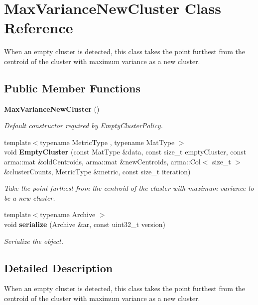 \section{Max\+Variance\+New\+Cluster Class Reference}
\label{classmlpack_1_1kmeans_1_1MaxVarianceNewCluster}


When an empty cluster is detected, this class takes the point furthest from the centroid of the cluster with maximum variance as a new cluster.  


\subsection*{Public Member Functions}
\begin{DoxyCompactItemize}
\item 
\textbf{ Max\+Variance\+New\+Cluster} ()
\begin{DoxyCompactList}\small\item\em Default constructor required by Empty\+Cluster\+Policy. \end{DoxyCompactList}\item 
{\footnotesize template$<$typename Metric\+Type , typename Mat\+Type $>$ }\\void \textbf{ Empty\+Cluster} (const Mat\+Type \&data, const size\+\_\+t empty\+Cluster, const arma\+::mat \&old\+Centroids, arma\+::mat \&new\+Centroids, arma\+::\+Col$<$ size\+\_\+t $>$ \&cluster\+Counts, Metric\+Type \&metric, const size\+\_\+t iteration)
\begin{DoxyCompactList}\small\item\em Take the point furthest from the centroid of the cluster with maximum variance to be a new cluster. \end{DoxyCompactList}\item 
{\footnotesize template$<$typename Archive $>$ }\\void \textbf{ serialize} (Archive \&ar, const uint32\+\_\+t version)
\begin{DoxyCompactList}\small\item\em Serialize the object. \end{DoxyCompactList}\end{DoxyCompactItemize}


\subsection{Detailed Description}
When an empty cluster is detected, this class takes the point furthest from the centroid of the cluster with maximum variance as a new cluster. 


